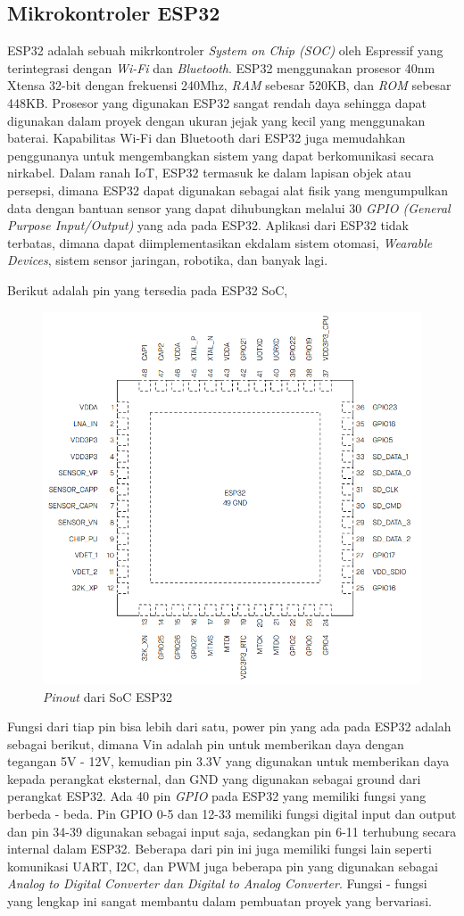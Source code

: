 \subsection{Mikrokontroler ESP32}
ESP32 adalah sebuah mikrkontroler \textit{System on Chip (SOC)} oleh Espressif yang terintegrasi dengan \textit{Wi-Fi} dan \textit{Bluetooth}. ESP32 menggunakan prosesor 40nm Xtensa 32-bit dengan frekuensi 240Mhz, \textit{RAM} sebesar 520KB, dan \textit{ROM} sebesar 448KB. Prosesor yang digunakan ESP32 sangat rendah daya sehingga dapat digunakan dalam proyek dengan ukuran jejak yang kecil yang menggunakan baterai. Kapabilitas Wi-Fi dan Bluetooth dari ESP32 juga memudahkan penggunanya untuk  mengembangkan sistem yang dapat berkomunikasi secara nirkabel. Dalam ranah IoT, ESP32 termasuk ke dalam lapisan objek atau persepsi, dimana ESP32 dapat digunakan sebagai alat fisik yang mengumpulkan data dengan bantuan sensor yang dapat dihubungkan melalui 30 \textit{GPIO (General Purpose Input/Output)} yang ada pada ESP32. Aplikasi dari ESP32 tidak terbatas, dimana dapat diimplementasikan ekdalam sistem otomasi, \textit{Wearable Devices}, sistem sensor jaringan, robotika, dan banyak lagi. \parencite{esp32}

Berikut adalah pin yang tersedia pada ESP32 SoC,

\begin{figure}[H]
    \centering
    \includegraphics[width=0.45\linewidth]{gambar/pinout-esp32.png}
    \caption{\emph{Pinout} dari SoC ESP32}
    \label{fig:esp-32-pinout}
\end{figure}

Fungsi dari tiap pin bisa lebih dari satu, power pin yang ada pada ESP32 adalah sebagai berikut, dimana Vin adalah pin untuk memberikan daya dengan tegangan 5V - 12V, kemudian pin 3.3V yang digunakan untuk memberikan daya kepada perangkat eksternal, dan GND yang digunakan sebagai ground dari perangkat ESP32.
Ada 40 pin \textit{GPIO} pada ESP32 yang memiliki fungsi yang berbeda - beda. Pin GPIO 0-5 dan 12-33 memiliki fungsi digital input dan output dan pin 34-39 digunakan sebagai input saja, sedangkan pin 6-11 terhubung secara internal dalam ESP32. Beberapa dari pin ini juga memiliki fungsi lain seperti komunikasi UART, I2C, dan PWM juga beberapa pin yang digunakan sebagai \textit{Analog to Digital Converter dan Digital to Analog Converter}. Fungsi - fungsi yang lengkap ini sangat membantu dalam pembuatan proyek yang bervariasi.


